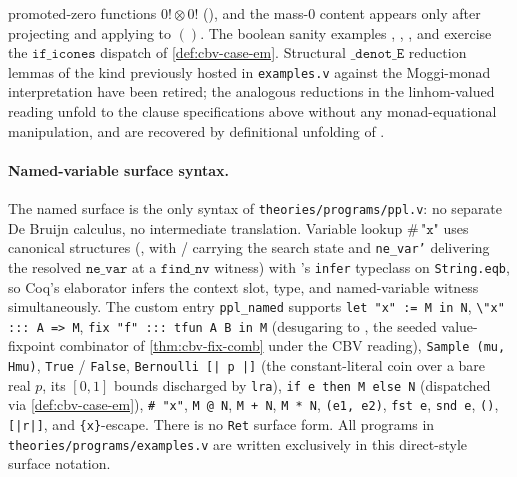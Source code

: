 promoted-zero functions $0!\otimes 0!$
(),
and the mass-$0$ content appears only after projecting and applying to
$()$. The boolean sanity examples
,
,
, and
 exercise the
$\mathtt{if\_icones}$ dispatch of \autoref{def:cbv-case-em}. Structural
$\mathtt{\_denot\_E}$ reduction lemmas of the kind previously hosted
in \texttt{examples.v} against the Moggi-monad interpretation have
been retired; the analogous reductions in the linhom-valued reading
unfold to the clause specifications above without any monad-equational
manipulation, and are recovered by definitional unfolding of
.

\paragraph{Named-variable surface syntax.}
The named surface is the only syntax of
\texttt{theories/programs/ppl.v}: no separate De Bruijn calculus, no
intermediate translation. Variable lookup $\#\,\texttt{"x"}$ uses
canonical structures
(, with
 /
 carrying the search state and
\texttt{ne\_var'} delivering the resolved
$\mathtt{ne\_var}$ at a $\mathtt{find\_nv}$ witness) with
\mathcompA{}'s \texttt{infer} typeclass on \texttt{String.eqb}, so
Coq's elaborator infers the context slot, type, and named-variable
witness simultaneously. The custom entry \texttt{ppl\_named} supports
\texttt{let "x" := M in N},
\texttt{\textbackslash "x" ::: A => M},
\texttt{fix "f" ::: tfun A B in M} (desugaring to
, the seeded value-fixpoint
combinator of \autoref{thm:cbv-fix-comb} under the CBV reading),
\texttt{Sample (mu, Hmu)},
\texttt{True} / \texttt{False},
\texttt{Bernoulli [| p |]} (the constant-literal coin over a bare
real $p$, its $[0,1]$ bounds discharged by \texttt{lra}),
\texttt{if e then M else N} (dispatched via
\autoref{def:cbv-case-em}),
\texttt{\# "x"}, \texttt{M @ N}, \texttt{M + N}, \texttt{M * N},
\texttt{(e1, e2)}, \texttt{fst e}, \texttt{snd e}, \texttt{()},
\texttt{[|r|]}, and \texttt{\{x\}}-escape. There is no
\texttt{Ret} surface form. All programs in
\texttt{theories/programs/examples.v} are written exclusively in this
direct-style surface notation.

